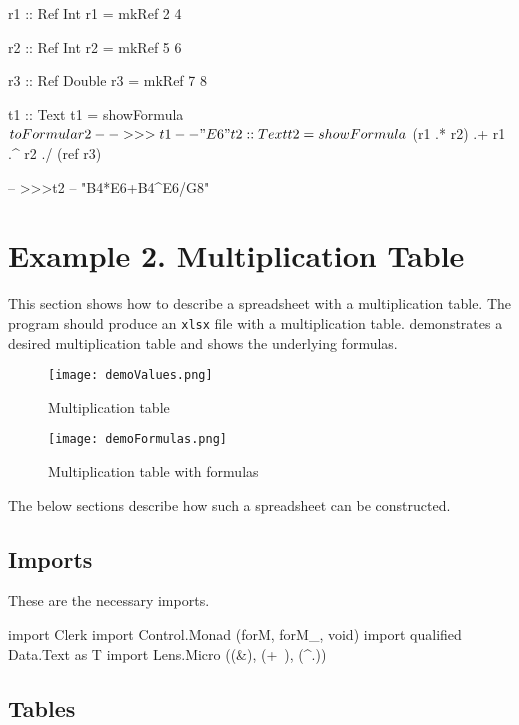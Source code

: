 \begin{mycode}
r1 :: Ref Int
r1 = mkRef 2 4

r2 :: Ref Int
r2 = mkRef 5 6

r3 :: Ref Double
r3 = mkRef 7 8

t1 :: Text
t1 = showFormula $ toFormula r2

-- >>>t1
-- "E6"

t2 :: Text
t2 = showFormula $ (r1 .* r2) .+ r1 .^ r2 ./ (ref r3)

-- >>>t2
-- "B4*E6+B4^E6/G8"
\end{mycode}

\section{Example 2. Multiplication Table}
\label{sec:ex2}

This section shows how to describe a spreadsheet with a multiplication table. The program should produce an \texttt{xlsx} file with a multiplication table.  demonstrates a desired multiplication table and  shows the underlying formulas.

\begin{figure}[h]
  \centering
  \texttt{[image: demoValues.png]}
  \caption{Multiplication table}
  \label{fig:mult}
\end{figure}


\begin{figure}[h]
  \centering
  \texttt{[image: demoFormulas.png]}
  \caption{Multiplication table with formulas}
  \label{fig:mult_formulas}
\end{figure}


The below sections describe how such a spreadsheet can be constructed.

\subsection{Imports}

These are the necessary imports.

\begin{mycode}
import Clerk
import Control.Monad (forM, forM_, void)
import qualified Data.Text as T
import Lens.Micro ((&), (+~), (^.))
\end{mycode}

\subsection{Tables}

